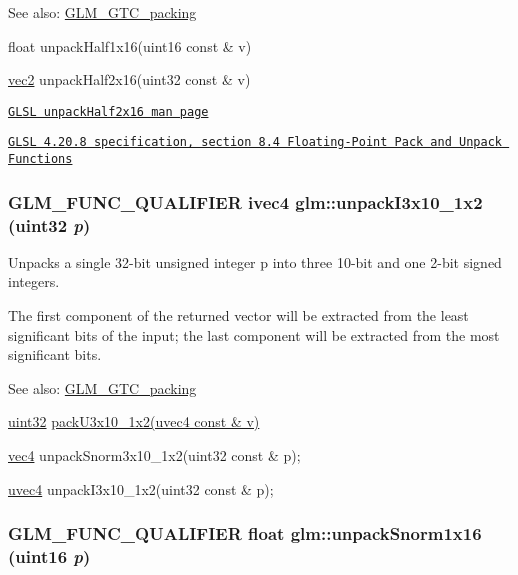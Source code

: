 \begin{Desc}
\item[See also:]\hyperlink{group__gtc__packing}{GLM\_\-GTC\_\-packing} 

float unpackHalf1x16(uint16 const \& v) 

\hyperlink{group__core__types_ga1618f51db67eaa145db101d8c8431d8}{vec2} unpackHalf2x16(uint32 const \& v) 

\href{http://www.opengl.org/sdk/docs/manglsl/xhtml/unpackHalf2x16.xml}{\tt GLSL unpackHalf2x16 man page} 

\href{http://www.opengl.org/registry/doc/GLSLangSpec.4.20.8.pdf}{\tt GLSL 4.20.8 specification, section 8.4 Floating-Point Pack and Unpack Functions} \end{Desc}
\hypertarget{group__gtc__packing_g08bcd34cf9c34701d658dd861ee6e300}{
\subsubsection[unpackI3x10\_\-1x2]{\setlength{\rightskip}{0pt plus 5cm}GLM\_\-FUNC\_\-QUALIFIER ivec4 glm::unpackI3x10\_\-1x2 (uint32 {\em p})}}
\label{group__gtc__packing_g08bcd34cf9c34701d658dd861ee6e300}


Unpacks a single 32-bit unsigned integer p into three 10-bit and one 2-bit signed integers.

The first component of the returned vector will be extracted from the least significant bits of the input; the last component will be extracted from the most significant bits.

\begin{Desc}
\item[See also:]\hyperlink{group__gtc__packing}{GLM\_\-GTC\_\-packing} 

\hyperlink{group__gtc__type__precision_g202b6a53c105fcb7e531f9b443518451}{uint32} \hyperlink{group__gtc__packing_gf656d8862628f96b20de7a36eaa1fe56}{packU3x10\_\-1x2(uvec4 const \& v)} 

\hyperlink{group__core__types_g5881b1b022d7fd1b7218f5916532dd02}{vec4} unpackSnorm3x10\_\-1x2(uint32 const \& p); 

\hyperlink{group__core__types_g1c426d19627b32b14f0089f7f4ba7b1d}{uvec4} unpackI3x10\_\-1x2(uint32 const \& p); \end{Desc}
\hypertarget{group__gtc__packing_g246f451cebf590726324f7a283e3d65e}{
\subsubsection[unpackSnorm1x16]{\setlength{\rightskip}{0pt plus 5cm}GLM\_\-FUNC\_\-QUALIFIER float glm::unpackSnorm1x16 (uint16 {\em p})}}
\label{group__gtc__packing_g246f451cebf590726324f7a283e3d65e}


